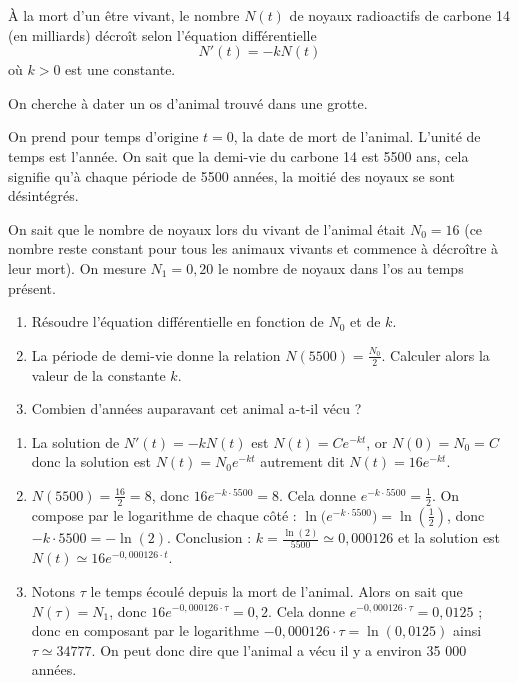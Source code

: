 \documentclass[11pt,class=report,crop=false]{standalone}
\begin{document}
\exercice{}
\enonce
\`A la mort d'un être vivant, le nombre $N(t)$ de noyaux radioactifs de carbone 14 (en milliards) décroît selon l'équation différentielle
$$N'(t) = -k N(t)$$
où $k>0$ est une constante.

On cherche à dater un os d'animal trouvé dans une grotte.

On prend pour temps d'origine $t=0$, la date de mort de l'animal. L'unité de temps est l'année. On sait que la \og{}demi-vie\fg{} du carbone 14 est 5500 ans, cela signifie qu'à chaque période de 5500 années, la moitié des noyaux se sont désintégrés.

On sait que le nombre de noyaux lors du vivant de l'animal était $N_0=16$ (ce nombre reste constant pour tous les animaux  vivants et commence à décroître à leur mort). On mesure $N_1 = 0,20$ le nombre de noyaux dans l'os au temps présent.
\begin{enumerate}
  \item Résoudre l'équation différentielle en fonction de $N_0$ et de $k$.
  \item La période de demi-vie donne la relation $N(5500)=\frac{N_0}{2}$. Calculer alors la valeur de la constante $k$.
  \item Combien d'années auparavant cet animal a-t-il vécu ?
\end{enumerate} 
\finenonce

\noindication

\correction
\sauteligne
\begin{enumerate}
  \item La solution de $N'(t) = -k N(t)$ est $N(t) = Ce^{-kt}$, or $N(0)=N_0=C$ donc la solution est $N(t) = N_0e^{-kt}$ autrement dit $N(t) = 16e^{-kt}$.

  \item $N(5500)=\frac{16}{2}=8$, donc $16e^{-k \cdot 5500}=8$. Cela donne $e^{-k \cdot 5500} = \frac12$. On compose par le logarithme de chaque côté : 
$\ln\big( e^{-k \cdot 5500} \big) = \ln(\frac12)$, donc $-k \cdot 5500 = -\ln(2)$. Conclusion : $k = \frac{\ln(2)}{5500} \simeq 0,000126$ et la solution est $N(t) \simeq 16 e^{-0,000126 \cdot t}$.

  \item Notons $\tau$ le temps écoulé depuis la mort de l'animal. Alors on sait que $N(\tau)=N_1$, donc $ 16 e^{-0,000126 \cdot \tau} = 0,2$. Cela donne
  $e^{-0,000126 \cdot \tau} = 0,0125$ ; donc en composant par le logarithme 
  $-0,000126 \cdot \tau = \ln(0,0125)$ ainsi $\tau \simeq 34777$. On peut donc dire que l'animal a vécu il y a environ 35 000 années. 
\end{enumerate} 
\fincorrection
\finexercice
\end{document}
